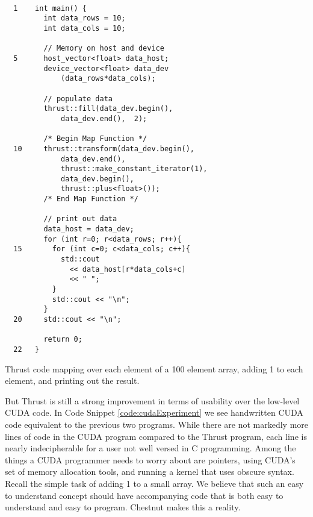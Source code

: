 \documentclass[twocolumn]{article}
\renewcommand{\|}{\origbar} %
\begin{document}
\begin{Code Snippet}
\begin{verbatim}

  1    int main() {
         int data_rows = 10;
         int data_cols = 10;

         // Memory on host and device
  5      host_vector<float> data_host; 
         device_vector<float> data_dev
             (data_rows*data_cols); 

         // populate data
         thrust::fill(data_dev.begin(),
             data_dev.end(),  2);

         /* Begin Map Function */
  10     thrust::transform(data_dev.begin(), 
             data_dev.end(), 
             thrust::make_constant_iterator(1), 
             data_dev.begin(), 
             thrust::plus<float>()); 
         /* End Map Function */

         // print out data
         data_host = data_dev;
         for (int r=0; r<data_rows; r++){
  15       for (int c=0; c<data_cols; c++){
             std::cout
               << data_host[r*data_cols+c]
               << " ";
           }
           std::cout << "\n";
         }
  20     std::cout << "\n";

         return 0;
  22   }
\end{verbatim}
\caption{Thrust code mapping over each element of a 100 element array, adding 1 to each element, and printing out the result.}
\label{code:thrustExperiment}
\end{Code Snippet}

But Thrust is still a strong improvement in terms of usability over the low-level CUDA code. In Code Snippet \ref{code:cudaExperiment} we see handwritten CUDA code equivalent to the previous two programs. While there are not markedly more lines of code in the CUDA program compared to the Thrust program, each line is nearly indecipherable for a user not well versed in C programming. Among the things a CUDA programmer needs to worry about are pointers, using CUDA's set of memory allocation tools, and running a kernel that uses obscure syntax. Recall the simple task of adding 1 to a small array. We believe that such an easy to understand concept should have accompanying code that is both easy to understand and easy to program. Chestnut makes this a reality.
\end{document}
